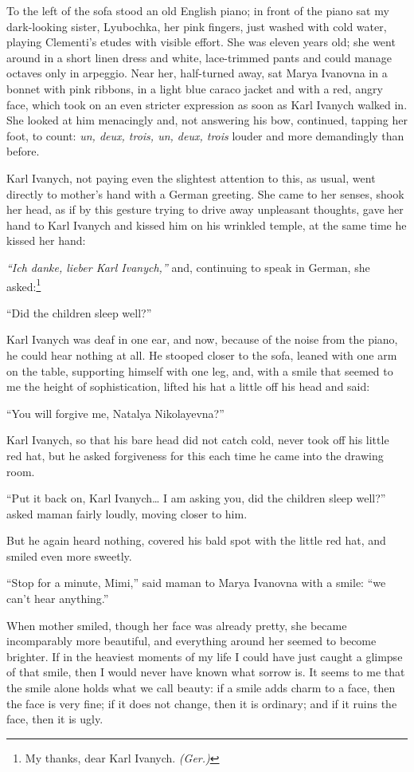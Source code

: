 To the left of the sofa stood an old English piano; in front of the piano sat my dark-looking sister, Lyubochka, her pink fingers, just washed with cold water, playing Clementi's etudes with visible effort. She was eleven years old; she went around in a short linen dress and white, lace-trimmed pants and could manage octaves only in arpeggio. Near her, half-turned away, sat Marya Ivanovna in a bonnet with pink ribbons, in a light blue caraco jacket and with a red, angry face, which took on an even stricter expression as soon as Karl Ivanych walked in. She looked at him menacingly and, not answering his bow, continued, tapping her foot, to count: \textit{un, deux, trois, un, deux, trois} louder and more demandingly than before.

Karl Ivanych, not paying even the slightest attention to this, as usual, went directly to mother's hand with a German greeting. She came to her senses, shook her head, as if by this gesture trying to drive away unpleasant thoughts, gave her hand to Karl Ivanych and kissed him on his wrinkled temple, at the same time he kissed her hand:

\textit{``Ich danke, lieber Karl Ivanych,''} and, continuing to speak in German, she asked:\footnote{My thanks, dear Karl Ivanych. \textit{(Ger.)}} %

``Did the children sleep well?'' %

Karl Ivanych was deaf in one ear, and now, because of the noise from the piano, he could hear nothing at all. He stooped closer to the sofa, leaned with one arm on the table, supporting himself with one leg, and, with a smile that seemed to me the height of sophistication, lifted his hat a little off his head and said:

``You will forgive me, Natalya Nikolayevna?'' %

Karl Ivanych, so that his bare head did not catch cold, never took off his little red hat, but he asked forgiveness for this each time he came into the drawing room.

``Put it back on, Karl Ivanych\ldots{} I am asking you, did the children sleep well?'' asked maman fairly loudly, moving closer to him. %

But he again heard nothing, covered his bald spot with the little red hat, and smiled even more sweetly.

``Stop for a minute, Mimi,'' said maman to Marya Ivanovna with a smile: ``we can't hear anything.'' %

When mother smiled, though her face was already pretty, she became incomparably more beautiful, and everything around her seemed to become brighter. If in the heaviest moments of my life I could have just caught a glimpse of that smile, then I would never have known what sorrow is. It seems to me that the smile alone holds what we call beauty: if a smile adds charm to a face, then the face is very fine; if it does not change, then it is ordinary; and if it ruins the face, then it is ugly.

